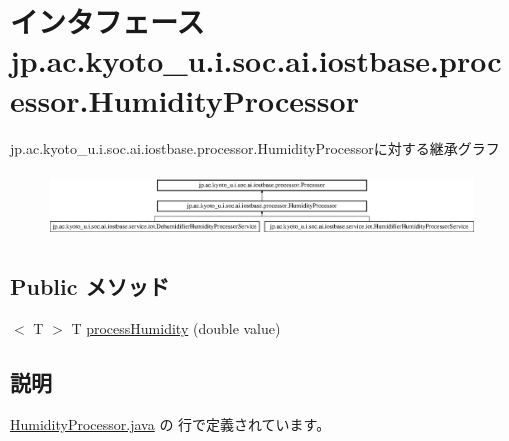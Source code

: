 \hypertarget{interfacejp_1_1ac_1_1kyoto__u_1_1i_1_1soc_1_1ai_1_1iostbase_1_1processor_1_1_humidity_processor}{\section{インタフェース jp.\-ac.\-kyoto\-\_\-u.\-i.\-soc.\-ai.\-iostbase.\-processor.\-Humidity\-Processor}
\label{interfacejp_1_1ac_1_1kyoto__u_1_1i_1_1soc_1_1ai_1_1iostbase_1_1processor_1_1_humidity_processor}
}
jp.\-ac.\-kyoto\-\_\-u.\-i.\-soc.\-ai.\-iostbase.\-processor.\-Humidity\-Processorに対する継承グラフ\begin{figure}[H]
\begin{center}
\leavevmode
\includegraphics[height=1.753654cm]{interfacejp_1_1ac_1_1kyoto__u_1_1i_1_1soc_1_1ai_1_1iostbase_1_1processor_1_1_humidity_processor}
\end{center}
\end{figure}
\subsection*{Public メソッド}
\begin{DoxyCompactItemize}
\item 
$<$ T $>$ T \hyperlink{interfacejp_1_1ac_1_1kyoto__u_1_1i_1_1soc_1_1ai_1_1iostbase_1_1processor_1_1_humidity_processor_a7a44899d3dc928408420f642805a7ea0}{process\-Humidity} (double value)
\end{DoxyCompactItemize}


\subsection{説明}


 \hyperlink{_humidity_processor_8java_source}{Humidity\-Processor.\-java} の  行で定義されています。



